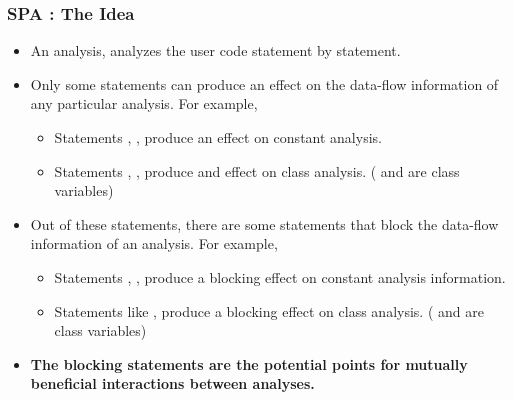 \begin{frame}
  \frametitle{SPA : The Idea}
    \begin{itemize}
        \item<2> An analysis, analyzes the user code statement by statement.

        \item<3> Only some statements can produce an effect on the data-flow information of any particular analysis. For example,
            \begin{itemize}
                \item Statements , ,  produce an effect on constant analysis.

                \item Statements , ,  produce and effect on class analysis. ( and  are class variables)
            \end{itemize}

       \item<4-> Out of these statements, there are some statements that block the data-flow information of an analysis. For example,
            \begin{itemize}
                \item Statements , ,  produce a blocking effect on constant analysis information.

                \item Statements like ,  produce a blocking effect on class analysis. ( and  are class variables)
            \end{itemize}

        \item<5-> \textbf{The blocking statements are the potential points for mutually beneficial interactions between analyses.}

    \end{itemize}

\end{frame}


